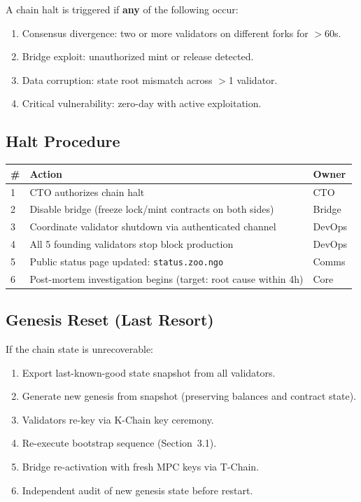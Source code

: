 \documentclass[11pt,letterpaper]{article}
\begin{document}
A chain halt is triggered if \textbf{any} of the following occur:

\begin{enumerate}[nosep]
  \item Consensus divergence: two or more validators on different forks for $>$60s.
  \item Bridge exploit: unauthorized mint or release detected.
  \item Data corruption: state root mismatch across $>$1 validator.
  \item Critical vulnerability: zero-day with active exploitation.
\end{enumerate}

\subsection{Halt Procedure}

\begin{tabularx}{\textwidth}{@{}l X l@{}}
\toprule
\textbf{\#} & \textbf{Action} & \textbf{Owner} \\
\midrule
1 & CTO authorizes chain halt                                          & CTO    \\
2 & Disable bridge (freeze lock/mint contracts on both sides)          & Bridge \\
3 & Coordinate validator shutdown via authenticated channel             & DevOps \\
4 & All 5 founding validators stop block production                    & DevOps \\
5 & Public status page updated: \texttt{status.zoo.ngo}                & Comms  \\
6 & Post-mortem investigation begins (target: root cause within 4h)    & Core   \\
\bottomrule
\end{tabularx}

\subsection{Genesis Reset (Last Resort)}

If the chain state is unrecoverable:

\begin{enumerate}[nosep]
  \item Export last-known-good state snapshot from all validators.
  \item Generate new genesis from snapshot (preserving balances and contract state).
  \item Validators re-key via K-Chain key ceremony.
  \item Re-execute bootstrap sequence (Section~3.1).
  \item Bridge re-activation with fresh MPC keys via T-Chain.
  \item Independent audit of new genesis state before restart.
\end{enumerate}
\end{document}

